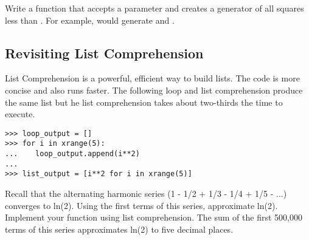 \begin{problem}
Write a function  that accepts a parameter  and creates a generator of all squares less than . For example,  would generate  and .
\end{problem}


\subsection*{Revisiting List Comprehension}
List Comprehension is a powerful, efficient way to build lists.  The code is more concise and also runs faster.  The following  loop and list comprehension produce the same list but he list comprehension takes about two-thirds the time to execute.

\begin{lstlisting}
>>> loop_output = []
>>> for i in xrange(5):
...    loop_output.append(i**2)
...
>>> list_output = [i**2 for i in xrange(5)]
\end{lstlisting}

\begin{problem}
Recall that the alternating harmonic series (1 - 1/2 + 1/3 - 1/4 + 1/5 - ...) converges to ln(2). Using the first  terms of this series, approximate ln(2).  Implement your function using list comprehension.  The sum of the first 500,000 terms of this series approximates ln(2) to five decimal places.
\end{problem}

\begin{comment}
\section*{Specifications}
We suggest that you submit your solutions in a file called \li{solutions.py}, using the following format.

\end{comment}
